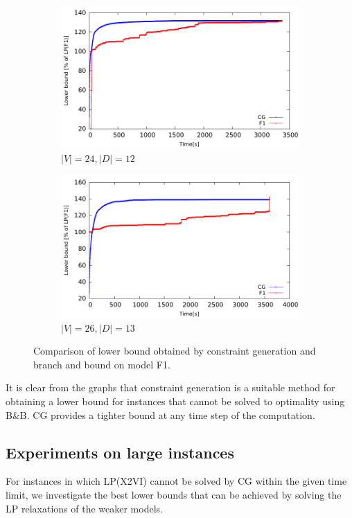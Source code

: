 \begin{figure}[!htb]
    \centering
    \begin{subfigure}[b]{0.46\textwidth}
        \includegraphics[width=\textwidth]{lower-bound-24-12-14}
        \caption{$|V|=24, |D|=12$}
        \label{fig:cggr1}
    \end{subfigure}
    \hfill %
    \begin{subfigure}[b]{0.46\textwidth}
        \includegraphics[width=\textwidth]{lower-bound-26-13-29}
        \caption{$|V|=26, |D|=13$}
        \label{fig:cggr2}
    \end{subfigure}
    \caption{Comparison of lower bound obtained by constraint generation and branch and bound on model F1. } \label{fig:cggr}
\end{figure} 

It is clear from the graphs that constraint generation is a suitable method for obtaining a lower bound for instances that cannot be solved to optimality using B\&B. CG provides a tighter bound at any time step of the computation.

\subsection{Experiments on large instances}

For instances in which LP(X2VI) cannot be solved by CG within the given time limit, we investigate the best lower bounds that can be achieved by solving the LP relaxations of the weaker models.
